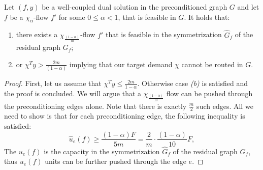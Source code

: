 \begin{lemma} \label{preconditioned_lemma}
Let $(f,y)$ be a well-coupled dual solution in the preconditioned graph $G$ and let $f$ be a $\chi_\alpha$-flow $f'$ for some $0\le\alpha<1$, that is feasible in $G$. It holds that:
\begin{enumerate}[label=(\alph*)]
    \item there exists a $\chi_{\frac{(1-\alpha)}{10}}$-flow $f'$ that is feasible in the symmetrization $\hat G_f$ of the residual graph $G_f$;
    \item or $\chi^Ty>\frac{2m}{(1-\alpha)}$ implying that our target demand $\chi$ cannot be routed in $G$.
\end{enumerate}
\end{lemma}
\begin{proof}
First, let us assume that $\chi^Ty \le \frac{2m}{1-\alpha}$. Otherwise case \textit{(b)} is satisfied and the proof is concluded. We will argue that a $\chi_{\frac{(1-\alpha)}{10}}$ flow can be pushed through the preconditioning edges alone. Note that there is exactly $\frac{m}{2}$ such edges. All we need to show is that for each preconditioning edge, the following inequality is satisfied:
\[
\hat u_e(f) \ge \frac{(1-\alpha)F}{5m} = \frac{2}{m}\cdot\frac{(1-\alpha)}{10}F,
\]
The $u_e(f)$ is the capacity in the symmetrization $\hat G_f$ of the residual graph $G_f$, thus $u_e(f)$ units can be further pushed through the edge $e$.


\end{proof}
